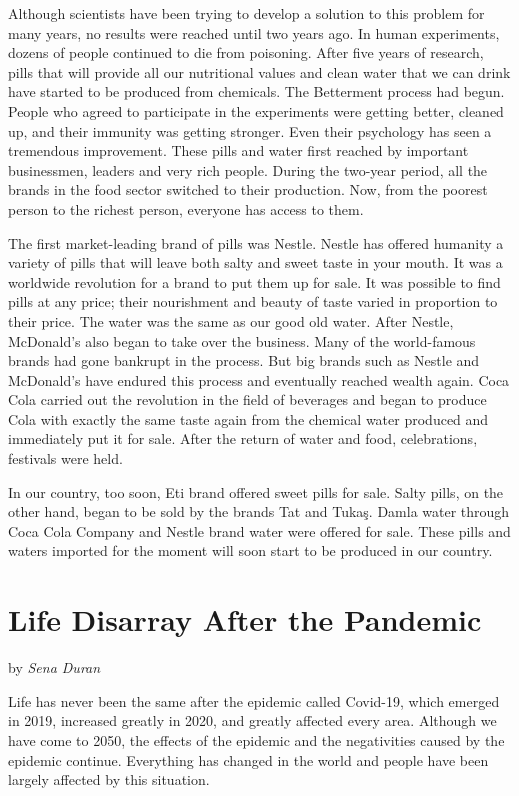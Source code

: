\documentclass[]{book}
\begin{document}
Although scientists have been trying to develop a solution to this problem for many years, no results were reached until two years ago. In human experiments, dozens of people continued to die from poisoning. After five years of research, pills that will provide all our nutritional values and clean water that we can drink have started to be produced from chemicals. The Betterment process had begun. People who agreed to participate in the experiments were getting better, cleaned up, and their immunity was getting stronger. Even their psychology has seen a tremendous improvement. These pills and water first reached by important businessmen, leaders and very rich people. During the two-year period, all the brands in the food sector switched to their production. Now, from the poorest person to the richest person, everyone has access to them.

The first market-leading brand of pills was Nestle. Nestle has offered humanity a variety of pills that will leave both salty and sweet taste in your mouth. It was a worldwide revolution for a brand to put them up for sale. It was possible to find pills at any price; their nourishment and beauty of taste varied in proportion to their price. The water was the same as our good old water. After Nestle, McDonald's also began to take over the business. Many of the world-famous brands had gone bankrupt in the process. But big brands such as Nestle and McDonald's have endured this process and eventually reached wealth again. Coca Cola carried out the revolution in the field of beverages and began to produce Cola with exactly the same taste again from the chemical water produced and immediately put it for sale. After the return of water and food, celebrations, festivals were held.

In our country, too soon, Eti brand offered sweet pills for sale. Salty pills, on the other hand, began to be sold by the brands Tat and Tukaş. Damla water through Coca Cola Company and Nestle brand water were offered for sale. These pills and waters imported for the moment will soon start to be produced in our country.

\hypertarget{life-disarray-after-the-pandemic}{%
\chapter{Life Disarray After the Pandemic}\label{life-disarray-after-the-pandemic}}

by \emph{Sena Duran}

Life has never been the same after the epidemic called Covid-19, which emerged in 2019, increased greatly in 2020, and greatly affected every area. Although we have come to 2050, the effects of the epidemic and the negativities caused by the epidemic continue. Everything has changed in the world and people have been largely affected by this situation.
\end{document}
